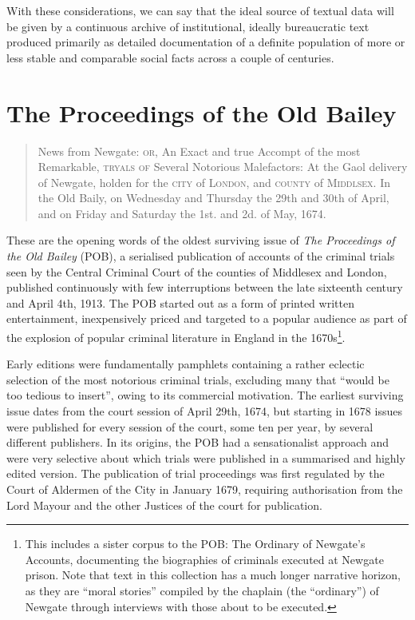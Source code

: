 With these considerations, we can say that the ideal source of textual data will be given by a continuous archive of institutional, ideally bureaucratic text produced primarily as detailed documentation of a definite population of more or less stable and comparable social facts across a couple of centuries.

\section{The Proceedings of the Old Bailey}
\label{sec:pobtrends}

\blockquote{
    \label{quot:newgate}
    News from Newgate: \textsc{or}, An Exact and true Accompt of the most Remarkable, \textsc{tryals of} Several Notorious Malefactors: At the Gaol delivery of Newgate, holden for the \textsc{city} of \textsc{London}, and \textsc{county} of \textsc{Middlsex}.
    In the Old Baily, on Wednesday and Thursday the 29th and 30th of April, and on Friday and Saturday the 1st. and 2d. of May, 1674.
}

These are the opening words of the oldest surviving issue of \emph{The Proceedings of the Old Bailey} (POB), a serialised publication of accounts of the criminal trials seen by the Central Criminal Court of the counties of Middlesex and London, published continuously with few interruptions between the late sixteenth century and April 4th, 1913.
The POB started out as a form of printed written entertainment, inexpensively priced and targeted to a popular audience as part of the explosion of popular criminal literature in England in the 1670s\footnote{
    \label{foot:ona}
    This includes a sister corpus to the POB: The Ordinary of Newgate's Accounts, documenting the biographies of criminals executed at Newgate prison.
    Note that text in this collection has a much longer narrative horizon, as they are ``moral stories'' compiled by the chaplain (the ``ordinary'') of Newgate through interviews with those about to be executed.
}.

Early editions were fundamentally pamphlets containing a rather eclectic selection of the most notorious criminal trials, excluding many that \enquote{would be too tedious to insert}, owing to its commercial motivation.
The earliest surviving issue dates from the court session of April 29th, 1674, but starting in 1678 issues were published for every session of the court, some ten per year, by several different publishers.
In its origins, the POB had a sensationalist approach and were very selective about which trials were published in a summarised and highly edited version.
The publication of trial proceedings was first regulated by the Court of Aldermen of the City in January 1679, requiring authorisation from the Lord Mayour and the other Justices of the court for publication.

